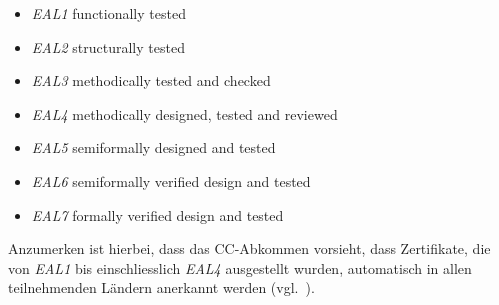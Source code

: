 \begin{itemize}
    \itemsep0.5em
    \item \textit{EAL1} functionally tested
    \item \textit{EAL2} structurally tested
    \item \textit{EAL3} methodically tested and checked
    \item \textit{EAL4} methodically designed, tested and reviewed
    \item \textit{EAL5} semiformally designed and tested
    \item \textit{EAL6} semiformally verified design and tested
    \item \textit{EAL7} formally verified design and tested
\end{itemize}

\noindent
Anzumerken ist hierbei, dass das CC-Abkommen vorsieht, dass Zertifikate, die von \textit{EAL1} bis einschliesslich \textit{EAL4} ausgestellt wurden, automatisch in allen teilnehmenden Ländern anerkannt werden (vgl.~\cite[96]{ITS2}).